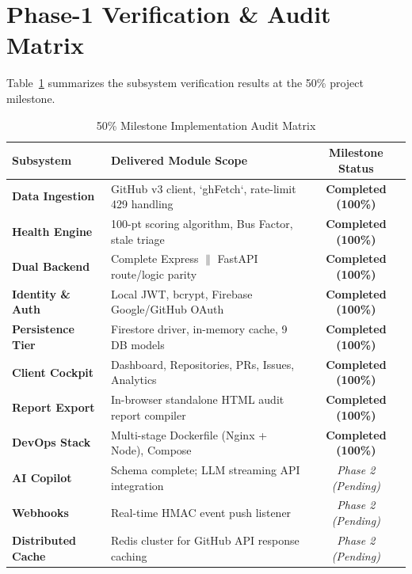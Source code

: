\documentclass[conference]{IEEEtran}
\begin{document}
\section{Phase-1 Verification \& Audit Matrix}

Table~\ref{tab:status} summarizes the subsystem verification results at the 50\% project milestone.

\begin{table}[htbp]
\caption{50\% Milestone Implementation Audit Matrix}
\label{tab:status}
\centering
\scriptsize
\begin{tabularx}{\columnwidth}{l X c}
\toprule
\textbf{Subsystem} & \textbf{Delivered Module Scope} & \textbf{Milestone Status} \\
\midrule
\textbf{Data Ingestion} & GitHub v3 client, `ghFetch`, rate-limit 429 handling & \textbf{Completed (100\%)} \\
\textbf{Health Engine} & 100-pt scoring algorithm, Bus Factor, stale triage & \textbf{Completed (100\%)} \\
\textbf{Dual Backend} & Complete Express $\parallel$ FastAPI route/logic parity & \textbf{Completed (100\%)} \\
\textbf{Identity \& Auth} & Local JWT, bcrypt, Firebase Google/GitHub OAuth & \textbf{Completed (100\%)} \\
\textbf{Persistence Tier}& Firestore driver, in-memory cache, 9 DB models & \textbf{Completed (100\%)} \\
\textbf{Client Cockpit} & Dashboard, Repositories, PRs, Issues, Analytics & \textbf{Completed (100\%)} \\
\textbf{Report Export} & In-browser standalone HTML audit report compiler & \textbf{Completed (100\%)} \\
\textbf{DevOps Stack} & Multi-stage Dockerfile (Nginx + Node), Compose & \textbf{Completed (100\%)} \\
\midrule
\textbf{AI Copilot} & Schema complete; LLM streaming API integration & \textit{Phase 2 (Pending)} \\
\textbf{Webhooks} & Real-time HMAC event push listener & \textit{Phase 2 (Pending)} \\
\textbf{Distributed Cache}& Redis cluster for GitHub API response caching & \textit{Phase 2 (Pending)} \\
\bottomrule
\end{tabularx}
\end{table}
\end{document}
